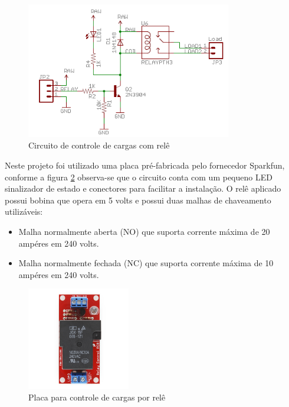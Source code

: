 \begin{figure}[h!]
			\centering
			\includegraphics[width=0.8\textwidth]{figures/circRele.png}
			\caption{Circuito de controle de cargas com relê}
			\label{fig:relay}
\end{figure}

Neste projeto foi utilizado uma placa pré-fabricada pelo fornecedor Sparkfun, conforme a figura \ref{fig:placarelay} observa-se que o circuito conta com um pequeno LED sinalizador de estado e conectores para facilitar a instalação. O relê aplicado possui bobina que opera em 5 volts e possui duas malhas de chaveamento utilizáveis:

\begin{itemize}
	\item Malha normalmente aberta (NO) que suporta corrente máxima de 20 ampéres em 240 volts.
	\item Malha normalmente fechada (NC) que suporta corrente máxima de 10 ampéres em 240 volts.
\end{itemize}

\begin{figure}[h!]
			\centering
			\includegraphics[width=0.4\textwidth]{figures/beefCake2.jpg}
			\caption{Placa para controle de cargas por relê}
			\label{fig:placarelay}
\end{figure}

